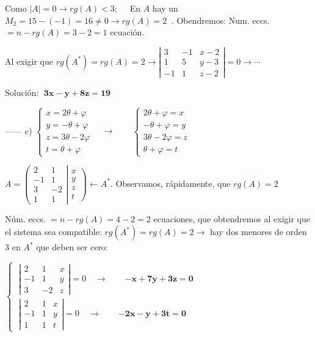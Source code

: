 \begin{proofw}
Como $|A|=0 \to rg (A)<3; \quad$ En $A$ hay un  $\boxed{M_2}=15-(-1)=16\neq 0 \to rg(A)=2\; \; $. 
Obendremos: Num. eccs. $=n-rg(A)=3-2=1$ ecuación.

Al exigir que $rg(A^*)=rg(A)=2 \to \left| \begin{matrix} \boxed{3}&\boxed{-1}&x-2\\\boxed{1}&\boxed{5}&y-3\\-1&1&z-2 \end{matrix} \right|=0 \to \cdots $

Solución: $\; \boldsymbol{3x-y+8z=19}$

------ c) $\begin{cases} x= 2\theta + \varphi\\y= -\theta+\varphi\\z=3\theta-2\varphi \\t=\theta+\varphi  \end{cases} \quad  \longrightarrow  \qquad \begin{cases} 2\theta + \varphi=x \\ -\theta+\varphi=y \\ 3\theta-2\varphi = z \\ \theta+\varphi=t  \end{cases} $

$A=\left( \begin{matrix} \boxed{2}&\boxed{1}\\\boxed{-1}&\boxed{1}\\3&-2\\1&1 \end{matrix} \right| \left. \begin{matrix} x\\y\\z\\t  \end{matrix} \right) \leftarrow A^*$.	 Observamos, rápidamente, que $rg(A)=2$

Núm. eccs. $=n-rg(A)=4-2=2$ ecuaciones, que obtendremos al exigir que el sistema sea compatible: $rg(A^*)=rg(A)=2 \to$ hay dos menores de orden $3$ en $A^*$ que deben ser cero:

$\begin{cases}
\; \left| \begin{matrix} 2&1&x\\-1&1&y\\3&-2&z \end{matrix} \right| =0 \quad \to \qquad \boldsymbol{-x+7y+3z=0}	\\
\; \left| \begin{matrix} 2&1&x\\-1&1&y\\1&1&t \end{matrix} \right| =0 \quad \to \qquad \boldsymbol{-2x-y+3t=0}	
\end{cases} $



\end{proofw}

